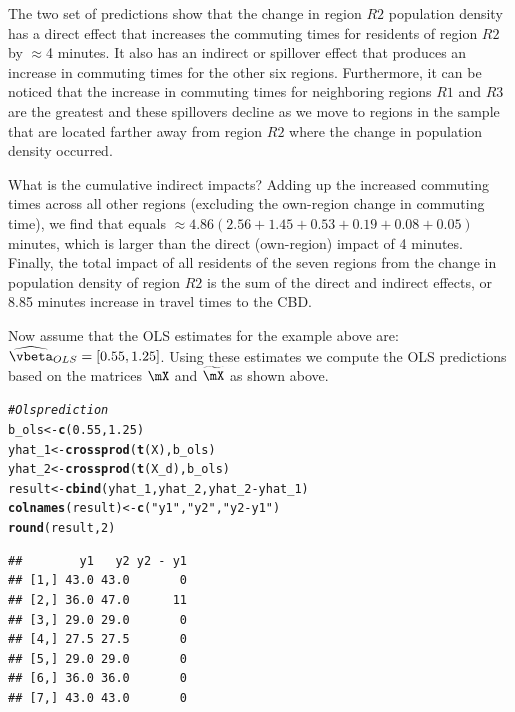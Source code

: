 \documentclass[english,12pt]{book}\usepackage[]{graphicx}\usepackage[]{xcolor}
\makeatletter
\newcommand{\hlnum}[1]{\textcolor[rgb]{0.686,0.059,0.569}{#1}}%
\newcommand{\hlstr}[1]{\textcolor[rgb]{0.192,0.494,0.8}{#1}}%
\newcommand{\hlcom}[1]{\textcolor[rgb]{0.678,0.584,0.686}{\textit{#1}}}%
\newcommand{\hlopt}[1]{\textcolor[rgb]{0,0,0}{#1}}%
\newcommand{\hlstd}[1]{\textcolor[rgb]{0.345,0.345,0.345}{#1}}%
\newcommand{\hlkwb}[1]{\textcolor[rgb]{0.69,0.353,0.396}{#1}}%
\newcommand{\hlkwd}[1]{\textcolor[rgb]{0.737,0.353,0.396}{\textbf{#1}}}%
\newenvironment{kframe}{%
 \def\at@end@of@kframe{}%
 \ifinner\ifhmode%
  \def\at@end@of@kframe{\end{minipage}}%
  \begin{minipage}{\columnwidth}%
 \fi\fi%
 \def\FrameCommand##1{\hskip\@totalleftmargin \hskip-\fboxsep
 \colorbox{shadecolor}{##1}\hskip-\fboxsep
     \hskip-\linewidth \hskip-\@totalleftmargin \hskip\columnwidth}%
 \MakeFramed {\advance\hsize-\width
   \@totalleftmargin\z@ \linewidth\hsize
   \@setminipage}}%
 {\par\unskip\endMakeFramed%
 \at@end@of@kframe}
\newenvironment{knitrout}{}{} %
\makeatother
\begin{document}
The two set of predictions show that the change in region $R2$ population density has a direct effect that increases the commuting times for residents of region $R2$ by $\approx$4 minutes. It also has an indirect or spillover effect that produces an increase in commuting times for the other six regions. Furthermore, it can be noticed that the increase in commuting times for neighboring regions $R1$ and $R3$ are the greatest and these spillovers decline as we move to regions in the sample that are located farther away from region $R2$ where the change in population density occurred. 

What is the cumulative indirect impacts? Adding up the increased commuting times across all other regions (excluding the own-region change in commuting time), we find that equals $\approx  4.86 (2.56 + 1.45 + 0.53 + 0.19 + 0.08 + 0.05)$ minutes, which is larger than the direct (own-region) impact of 4 minutes. Finally, the total impact of all residents of the seven regions from the change in population density of region $R2$ is the sum of the direct and indirect effects, or 8.85 minutes increase in travel times to the CBD. 

Now assume that the OLS estimates for the example above are: $\widehat{\vbeta}_{OLS} = \left[0.55, 1.25\right]$. Using these estimates we compute the OLS predictions based on the matrices $\mX$ and $\widetilde{\mX}$ as shown above.

\begin{knitrout}
\color{fgcolor}\begin{kframe}
\begin{alltt}
\hlcom{# Ols prediction}
\hlstd{b_ols} \hlkwb{<-} \hlkwd{c}\hlstd{(}\hlnum{0.55}\hlstd{,} \hlnum{1.25}\hlstd{)}
\hlstd{yhat_1} \hlkwb{<-} \hlkwd{crossprod}\hlstd{(}\hlkwd{t}\hlstd{(X), b_ols)}
\hlstd{yhat_2} \hlkwb{<-} \hlkwd{crossprod}\hlstd{(}\hlkwd{t}\hlstd{(X_d), b_ols)}
\hlstd{result} \hlkwb{<-} \hlkwd{cbind}\hlstd{(yhat_1, yhat_2, yhat_2} \hlopt{-} \hlstd{yhat_1)}
\hlkwd{colnames}\hlstd{(result)} \hlkwb{<-} \hlkwd{c}\hlstd{(}\hlstr{"y1"}\hlstd{,} \hlstr{"y2"}\hlstd{,} \hlstr{"y2 - y1"}\hlstd{)}
\hlkwd{round}\hlstd{(result,} \hlnum{2}\hlstd{)}
\end{alltt}
\begin{verbatim}
##        y1   y2 y2 - y1
## [1,] 43.0 43.0       0
## [2,] 36.0 47.0      11
## [3,] 29.0 29.0       0
## [4,] 27.5 27.5       0
## [5,] 29.0 29.0       0
## [6,] 36.0 36.0       0
## [7,] 43.0 43.0       0
\end{verbatim}
\end{kframe}
\end{knitrout}
\end{document}
